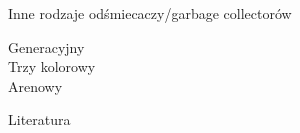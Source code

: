 \documentclass[xcolor=table]{beamer}
\begin{document}
\begin{frame}{Inne rodzaje odśmiecaczy/garbage collectorów}
\begin{block}{}
Generacyjny \\
Trzy kolorowy  \\
Arenowy
\end{block}


\end{frame}

\begin{frame}[allowframebreaks]{Literatura}

\begin{thebibliography}{99}

 
\end{thebibliography}

\end{frame}
\end{document}
